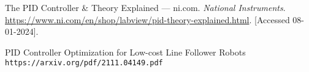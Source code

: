 \begin{thebibliography}{9}
    The {P}{I}{D} {C}ontroller \& {T}heory {E}xplained --- ni.com.
    \textit{National Instruments}.
    \url{https://www.ni.com/en/shop/labview/pid-theory-explained.html}.
    [Accessed 08-01-2024].

    PID Controller Optimization for Low-cost Line
Follower Robots
    \\\texttt{https://arxiv.org/pdf/2111.04149.pdf}
\end{thebibliography}
